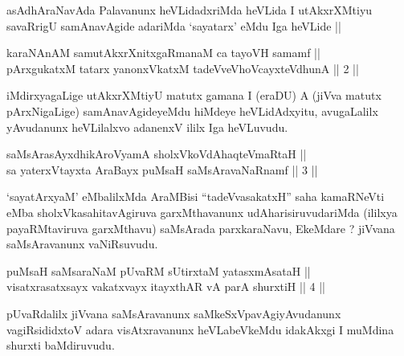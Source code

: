 \begin{artha}
asAdhAraNavAda Palavanunx heVLidadxriMda heVLida I utAkxrXMtiyu
savaRrigU samAnavAgide adariMda `sayatarx' eMdu Iga heVLide ||
\end{artha}


\begin{shl}
karaNAnAM samutAkxrXnitxgaRmanaM ca tayoVH samamf || \\
pArxgukatxM tatarx yanonxVkatxM tadeVveVhoVcayxteV\s dhunA \hfill || 2 ||
  
\end{shl}

\begin{artha}
iMdirxyagaLige utAkxrXMtiyU matutx gamana I (eraDU) A (jiVva matutx
pArxNigaLige) samAnavAgideyeMdu hiMdeye heVLidAdxyitu, avugaLalilx
yAvudanunx heVLilalxvo adanenxV ililx Iga heVLuvudu.
\end{artha}


\begin{shl}
saMsArasAyxdhikAroV\s yamA sholxVkoVdAhaqteVmaRtaH || \\
sa yaterxVtayxta AraBayx puMsaH saMsAravaNaRnamf \hfill || 3 ||
  
\end{shl}

\begin{artha}
`sayatArxyaM' eMbalilxMda AraMBisi ``tadeVvasakatxH'' saha kamaRNeVti
eMba sholxVkasahitavAgiruva garxMthavanunx udAharisiruvudariMda
(ililxya payaRMtaviruva garxMthavu) saMsArada parxkaraNavu,
EkeMdare ? jiVvana saMsAravanunx vaNiRsuvudu.
\end{artha}


\begin{shl}
puMsaH saMsaraNaM pUvaRM sUtirxtaM yatasxmAsataH || \\
visatxrasatxsayx vakatxvayx itayxthAR vA parA shurxtiH \hfill || 4 ||
  
\end{shl}

\begin{artha}
pUvaRdalilx jiVvana saMsAravanunx saMkeSxVpavAgiyAvudanunx
vagiRsididxtoV adara visAtxravanunx heVLabeVkeMdu idakAkxgi I muMdina
shurxti baMdiruvudu.
\end{artha}

